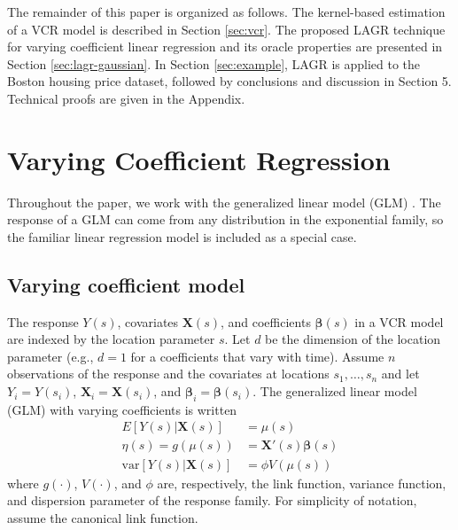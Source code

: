 \documentclass[authoryear,review, 12pt]{elsarticle}
\begin{document}
The remainder of this paper is organized as follows. The kernel-based
estimation of a VCR model is described in Section \ref{sec:vcr}.
The proposed LAGR technique for varying coefficient linear regression
and its oracle properties are presented in Section \ref{sec:lagr-gaussian}.
In Section \ref{sec:example},
LAGR is applied to the Boston housing price dataset, followed
by conclusions and discussion in Section 5. Technical proofs are given in the Appendix.

\section{Varying Coefficient Regression\label{sec:vcr}}
Throughout the paper, we work with the generalized linear model (GLM) \citep{McCullagh-Nelder-1989}. The response of a GLM can come from any distribution in the exponential family, so the familiar linear regression model is included as a special case.

\subsection{Varying coefficient model}
The response $Y(s)$, covariates $\bm{X}(s)$, and coefficients $\bm{\beta}(s)$ in a VCR model are indexed by the location parameter $s$. Let $d$ be the dimension of the location parameter (e.g., $d=1$ for a coefficients that vary with time). Assume $n$ observations of the response and the covariates at locations $s_1, \dots, s_n$ and let $Y_i = Y(s_i)$, $\bm{X}_i = \bm{X}(s_i)$, and $\bm{\beta}_i = \bm{\beta}(s_i)$. The generalized linear model (GLM) with varying coefficients is written
\begin{align*}
	E[Y(s)|\bm{X}(s)] &= \mu(s)\\
	\eta(s) = g(\mu(s)) &= \bm{X}'(s) \bm{\beta}(s)\\
	\text{var}[Y(s)|\bm{X}(s)] &= \phi V(\mu(s))
\end{align*}
where $g(\cdot)$, $V(\cdot)$, and $\phi$ are, respectively, the link function, variance function, and dispersion parameter of the response family. For simplicity of notation, assume the canonical link function.
\end{document}
